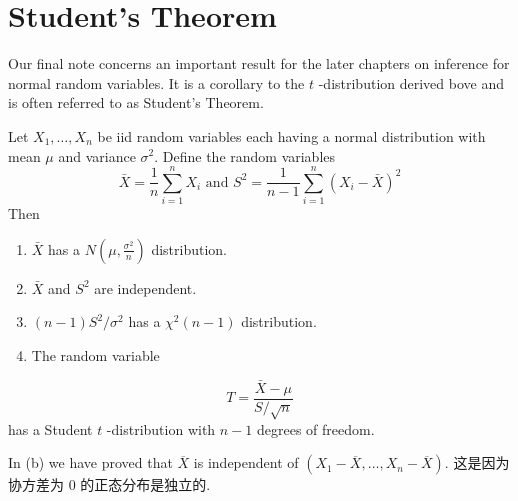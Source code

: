 \section{Student's Theorem}

Our final note concerns an important result for the later chapters on inference for normal random variables. It is a corollary to the $t$ -distribution derived bove and is often referred to as Student's Theorem.

\begin{theorem}
Let $X_1, \ldots, X_n$ be iid random variables each having a normal distribution with mean $\mu$ and variance $\sigma^2$. Define the random variables
\[
\bar{X}=\frac{1}{n} \sum_{i=1}^n X_i \text { and } S^2=\frac{1}{n-1} \sum_{i=1}^n\left(X_i-\bar{X}\right)^2
\]Then
	\begin{enumerate}
		\item $\bar{X}$ has a $N\left(\mu, \frac{\sigma^2}{n}\right)$ distribution.
		\item $\bar{X}$ and $S^2$ are independent.
		\item $(n-1) S^2 / \sigma^2$ has a $\chi^2(n-1)$ distribution.
		\item The random variable
	\end{enumerate}
\[
T=\frac{\bar{X}-\mu}{S / \sqrt{n}}
\]has a Student $t$ -distribution with $n-1$ degrees of freedom.
\end{theorem}
\begin{remark}
In (b) we have proved that $\overline{X}$ is independent of $(X_1-\overline{X},\dots,X_n-\overline{X})$. 这是因为协方差为 0 的正态分布是独立的.
\end{remark}
